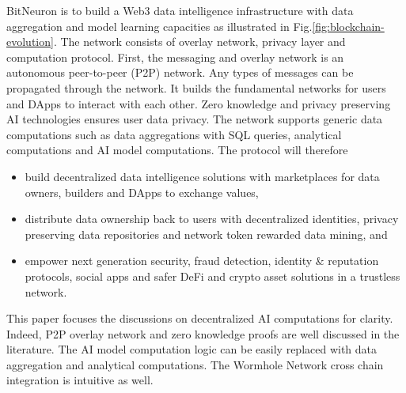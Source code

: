 \documentclass[11pt,letterpaper]{article}
\begin{document}
BitNeuron is to build a Web3 data intelligence infrastructure with data aggregation and model learning capacities as illustrated in Fig.\ref{fig:blockchain-evolution}. The network consists of overlay network, privacy layer and computation protocol. First, the messaging and overlay network is an autonomous peer-to-peer (P2P) network. Any types of messages can be propagated through the network. It builds the fundamental networks for users and DApps to interact with each other. Zero knowledge and privacy preserving AI technologies ensures user data privacy. The network supports generic data computations such as data aggregations with SQL queries, analytical computations and AI model computations. The protocol will therefore
\begin{itemize}
    \item build decentralized data intelligence solutions with marketplaces for data owners, builders and DApps to exchange values,
    \item distribute data ownership back to users with decentralized identities, privacy preserving data repositories and network token rewarded data mining, and
    \item empower next generation security, fraud detection, identity $\&$ reputation protocols, social apps and safer DeFi and crypto asset solutions in a trustless network.
\end{itemize}

This paper focuses the discussions on decentralized AI computations for clarity. Indeed, P2P overlay network and zero knowledge proofs are well discussed in the literature. The AI model computation logic can be easily replaced with data aggregation and analytical computations. The Wormhole Network cross chain integration is intuitive as well.
\end{document}
